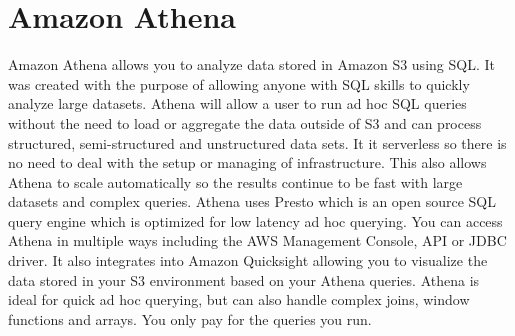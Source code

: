 \section{Amazon Athena}

Amazon Athena\cite{hid-sp18-521-athena-faq} allows you to analyze data
stored in Amazon S3 using SQL. It was created with the purpose of
allowing anyone with SQL skills to quickly analyze large datasets.
Athena will allow a user to run ad hoc SQL queries without the need to
load or aggregate the data outside of S3 and can process structured,
semi-structured and unstructured data sets. It it serverless so there
is no need to deal with the setup or managing of infrastructure. This
also allows Athena to scale automatically so the results continue to
be fast with large datasets and complex queries. Athena uses Presto
which is an open source SQL query engine which is optimized for low
latency ad hoc querying. You can access Athena in multiple ways
including the AWS Management Console, API or JDBC driver. It also
integrates into Amazon Quicksight allowing you to visualize the data
stored in your S3 environment based on your Athena queries. Athena is
ideal for quick ad hoc querying, but can also handle complex joins,
window functions and arrays. You only pay for the queries you run.
